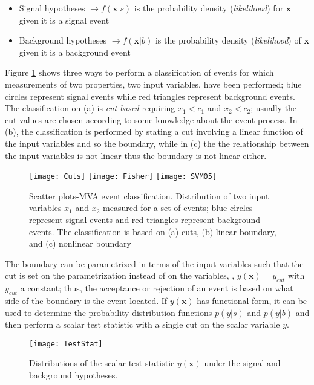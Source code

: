\begin{itemize}
\item Signal hypotheses $\to f(\textbf{x}|s)$ is the probability density (\textit{likelihood}) for $\textbf{x}$ given it is a signal event 
\item Background hypotheses $ \to f(\textbf{x}|b)$ is the probability density (\textit{likelihood}) of $\textbf{x}$ given it is a background event
\end{itemize}

Figure \ref{fig:scatter_plot} shows three ways to perform a classification of events for which measurements of two properties, two input variables, have been performed; blue circles represent signal events while red triangles represent background events. The classification on (a) is \textit{cut-based} requiring $x_1<c_1$ and $x_2<c_2$; usually the cut values are chosen according to some knowledge about the event process. In (b), the classification is performed by stating a cut involving a linear function of the input variables and so the boundary, while in (c) the the relationship between the input variables is not linear thus the boundary is not linear either.          

\begin{figure}[!h]
  \centering
  \texttt{[image: Cuts]}
  \texttt{[image: Fisher]}
  \texttt{[image: SVM05]}
  \caption[Scatter plots-MVA event classification.]{Scatter plots-MVA event classification. Distribution of two input variables $x_1$ and $x_2$ measured for a set of events; blue circles represent signal events and red triangles represent background events. The classification is based on (a) cuts, (b) linear boundary, and (c) nonlinear boundary\cite{mva}}\label{fig:scatter_plot}
\end{figure}

The boundary can be parametrized in terms of the input variables such that the cut is set on the parametrization instead of on the variables, \ie, $y(\textbf{x})=y_{cut}$ with $y_{cut}$ a constant; thus, the acceptance or rejection of an event is based on what side of the boundary is the event located. If $y(\textbf{x})$ has functional form, it can be used to determine the probability distribution functions $p(y|s)$ and $p(y|b)$ and then perform a scalar test statistic with a single cut on the scalar variable $y$. 

\begin{figure}[!h]
  \centering
  \texttt{[image: TestStat]}
  \caption[Scalar test statistical.]{Distributions of the scalar test statistic $y(\textbf{x})$ under the signal and background hypotheses.\cite{mva}}\label{fig:scalar_test}
\end{figure}

